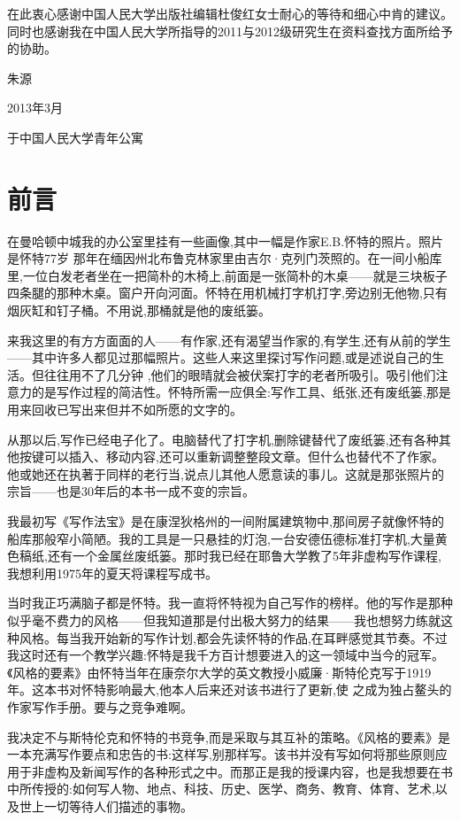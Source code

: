 \documentclass{ctexbook}
\begin{document}
在此衷心感谢中国人民大学出版社编辑杜俊红女士耐心的等待和细心中肯的建议。同时也感谢我在中国人民大学所指导的2011与2012级研究生在资料查找方面所给予的协助。

朱源

2013年3月

于中国人民大学青年公寓

\chapter*{前言}
在曼哈顿中城我的办公室里挂有一些画像,其中一幅是作家E.B.怀特的照片。照片是怀特77岁 那年在缅因州北布鲁克林家里由吉尔·克列门茨照的。在一间小船库里,一位白发老者坐在一把简朴的木椅上,前面是一张简朴的木桌——就是三块板子四条腿的那种木桌。窗户开向河面。怀特在用机械打字机打字,旁边别无他物,只有烟灰缸和钉子桶。不用说,那桶就是他的废纸篓。

来我这里的有方方面面的人——有作家,还有渴望当作家的,有学生,还有从前的学生——其中许多人都见过那幅照片。这些人来这里探讨写作问题,或是述说自己的生活。但往往用不了几分钟 ,他们的眼晴就会被伏案打字的老者所吸引。吸引他们注意力的是写作过程的简洁性。怀特所需一应俱全:写作工具、纸张,还有废纸篓,那是用来回收已写出来但并不如所愿的文字的。

从那以后,写作已经电子化了。电脑替代了打字机,删除键替代了废纸篓,还有各种其他按键可以插入、移动内容,还可以重新调整整段文章。但什么也替代不了作家。他或她还在执著于同样的老行当,说点儿其他人愿意读的事儿。这就是那张照片的宗旨——也是30年后的本书一成不变的宗旨。

我最初写《写作法宝》是在康涅狄格州的一间附属建筑物中,那间房子就像怀特的船库那般窄小简陋。我的工具是一只悬挂的灯泡,一台安德伍德标准打字机,大量黄色稿纸,还有一个金属丝废纸篓。那时我已经在耶鲁大学教了5年非虚构写作课程,我想利用1975年的夏天将课程写成书。

当时我正巧满脑子都是怀特。我一直将怀特视为自己写作的榜样。他的写作是那种似乎毫不费力的风格——但我知道那是付出极大努力的结果——我也想努力练就这种风格。每当我开始新的写作计划,都会先读怀特的作品,在耳畔感觉其节奏。不过我这时还有一个教学兴趣:怀特是我千方百计想要进入的这一领域中当今的冠军。《风格的要素》由怀特当年在康奈尔大学的英文教授小威廉·斯特伦克写于1919年。这本书对怀特影响最大,他本人后来还对该书进行了更新,使 之成为独占鳌头的作家写作手册。要与之竞争难啊。

我决定不与斯特伦克和怀特的书竞争,而是采取与其互补的策略。《风格的要素》是一本充满写作要点和忠告的书:这样写,别那样写。该书并没有写如何将那些原则应用于非虚构及新闻写作的各种形式之中。而那正是我的授课内容，也是我想要在书中所传授的:如何写人物、地点、科技、历史、医学、商务、教育、体育、艺术,以及世上一切等待人们描述的事物。
\end{document}
